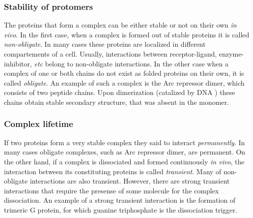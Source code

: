 \subsubsection{Stability of protomers}
The proteins that form a complex can be either stable or not on their own \emph{in vivo}. In the first case, when a complex is formed out of stable proteins it is called \emph{non-obligate}.
In many cases these proteins are localized in different compartements of a cell. Usually, interactions between receptor-ligand, enzyme-inhibitor, \emph{etc} belong to
non-obligate interactions. In the other case when a complex of one or both chains do not exist as folded proteins on their own, it is called \emph{obligate}.
An example of such a complex is the Arc repressor dimer, which consists of two peptide chains. Upon dimerization (catalized by DNA \cite{marcovitz2009arc}) these chains 
obtain stable secondary structure, that was absent in the monomer.

\subsubsection{Complex lifetime}
If two proteins form a very stable complex they said to interact \emph{permanently}. In many cases obligate complexes, such as Arc repressor dimer, are permanent.
On the other hand, if a complex is dissociated and formed continuously \emph{in vivo}, the interaction between its constituting proteins is called \emph{transient}. 
Many of non-obligate interactions are also transient. However, there are strong transient interactions that require the presense of some molecule for the complex 
dissociation. An example of a strong transient interaction is the formation of trimeric G protein, for which guanine triphosphate is the dissociation trigger.